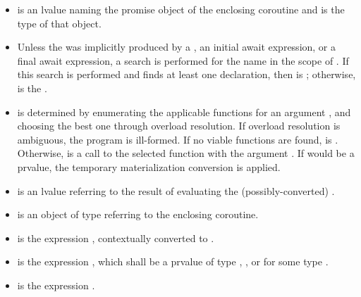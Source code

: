 \begin{itemize}
\item
{} is an lvalue naming the promise
object
of the enclosing coroutine and  is the type of that object.

\item Unless
the  was implicitly produced by
a ,
an initial await expression,
or a final await expression,
a search is performed for the name 
in the scope of  .
If this search is performed and finds at least one declaration,
then  is
\mbox{\tcode{)}};
otherwise,  is the  .

\item
{} is determined by enumerating the applicable
 functions for an argument
, and choosing the best one through
overload resolution. If overload resolution is ambiguous,
the program is ill-formed.
If no viable functions are found,  is .
Otherwise,  is a call to the selected function
with the argument .
If  would be a prvalue,
the temporary materialization conversion is applied.

\item
{} is an lvalue
referring to the result of evaluating
the (possibly-converted) .

\item
 is an object of type
referring to the enclosing coroutine.

\item
{} is the expression
,
contextually converted to .

\item
{} is the expression
\tcode{)},
which shall be a prvalue of type , , or
 for some type .

\item
{} is the expression
.
\end{itemize}

